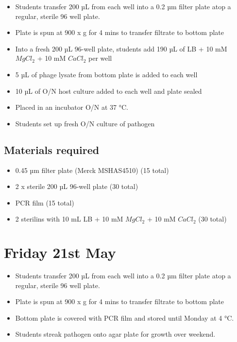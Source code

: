 \documentclass[
]{book}
\providecommand{\tightlist}{%
  \setlength{\itemsep}{0pt}\setlength{\parskip}{0pt}}
\begin{document}
\begin{itemize}
\tightlist
\item
  Students transfer 200 µL from each well into a 0.2 µm filter plate atop a regular, sterile 96 well plate.
\item
  Plate is spun at 900 x g for 4 mins to transfer filtrate to bottom plate
\item
  Into a fresh 200 µL 96-well plate, students add 190 µL of LB + 10 mM \(MgCl_{2}\) + 10 mM \(CaCl_{2}\) per well
\item
  5 µL of phage lysate from bottom plate is added to each well
\item
  10 µL of O/N host culture added to each well and plate sealed
\item
  Placed in an incubator O/N at 37 °C.
\item
  Students set up fresh O/N culture of pathogen
\end{itemize}

\hypertarget{materials-required-3}{%
\subsection{Materials required}\label{materials-required-3}}

\begin{itemize}
\tightlist
\item
  0.45 µm filter plate (Merck MSHAS4510) (15 total)
\item
  2 x sterile 200 µL 96-well plate (30 total)
\item
  PCR film (15 total)
\item
  2 sterilins with 10 mL LB + 10 mM \(MgCl_{2}\) + 10 mM \(CaCl_{2}\) (30 total)
\end{itemize}

\hypertarget{friday-21st-may}{%
\section{Friday 21st May}\label{friday-21st-may}}

\begin{itemize}
\tightlist
\item
  Students transfer 200 µL from each well into a 0.2 µm filter plate atop a regular, sterile 96 well plate.
\item
  Plate is spun at 900 x g for 4 mins to transfer filtrate to bottom plate
\item
  Bottom plate is covered with PCR film and stored until Monday at 4 °C.
\item
  Students streak pathogen onto agar plate for growth over weekend.
\end{itemize}
\end{document}

